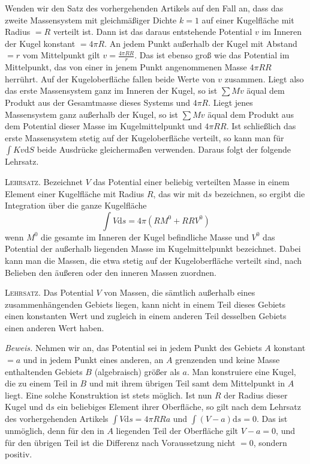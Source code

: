 Wenden wir den Satz des vorhergehenden Artikels auf den Fall an, dass das zweite Massensystem mit gleichmäßiger Dichte $k=1$ auf einer Kugelfläche mit Radius $=R$ verteilt ist. Dann ist das daraus entstehende Potential $v$ im Inneren der Kugel konstant $=4\pi R$. An jedem Punkt außerhalb der Kugel mit Abstand $=r$ vom Mittelpunkt gilt $v=\frac{4\pi RR}{r}$. Das ist ebenso groß wie das Potential im Mittelpunkt, das von einer in jenem Punkt angenommenen Masse $4\pi RR$ herrührt. Auf der Kugeloberfläche fallen beide Werte von $v$ zusammen. Liegt also das erste Massensystem ganz im Inneren der Kugel, so ist $\sum Mv$ äqual dem Produkt aus der Gesamtmasse dieses Systems und $4\pi R$. Liegt jenes Massensystem ganz außerhalb der Kugel, so ist $\sum Mv$ äqual dem Produkt aus dem Potential dieser Masse im Kugelmittelpunkt und $4\pi RR$. Ist schließlich das erste Massensystem stetig auf der Kugeloberfläche verteilt, so kann man für $\int Kv\mathrm dS$ beide Ausdrücke gleichermaßen verwenden. Daraus folgt der folgende Lehrsatz.

\textsc{Lehrsatz.} Bezeichnet $V$ das Potential einer beliebig verteilten Masse in einem Element einer Kugelfläche mit Radius $R$, das wir mit $\mathrm ds$ bezeichnen, so ergibt die Integration über die ganze Kugelfläche
\[
\int V\mathrm ds=4\pi(RM^0+RRV^0)
\]
wenn $M^0$ die gesamte im Inneren der Kugel befindliche Masse und $V^0$ das Potential der außerhalb liegenden Masse im Kugelmittelpunkt bezeichnet. Dabei kann man die Massen, die etwa stetig auf der Kugeloberfläche verteilt sind, nach Belieben den äußeren oder den inneren Massen zuordnen.

%
\textsc{Lehrsatz.} Das Potential $V$ von Massen, die sämtlich außerhalb eines zusammenhängenden Gebiets liegen, kann nicht in einem Teil dieses Gebiets einen konstanten Wert und zugleich in einem anderen Teil desselben Gebiets einen anderen Wert haben.

\textit{Beweis.} Nehmen wir an, das Potential sei in jedem Punkt des Gebiets $A$ konstant $=a$ und in jedem Punkt eines anderen, an $A$ grenzenden und keine Masse enthaltenden Gebiets $B$ (algebraisch) größer als $a$. Man konstruiere eine Kugel, die zu einem Teil in $B$ und mit ihrem übrigen Teil samt dem Mittelpunkt in $A$ liegt. Eine solche Konstruktion ist stets möglich. Ist nun $R$ der Radius dieser Kugel und $\mathrm ds$ ein beliebiges Element ihrer Oberfläche, so gilt nach dem Lehrsatz des vorhergehenden Artikels $\int V\mathrm ds=4\pi RRa$ und $\int(V-a)\mathrm ds=0$. Das ist unmöglich, denn für den in $A$ liegenden Teil der Oberfläche gilt $V-a=0$, und für den übrigen Teil ist die Differenz nach Voraussetzung nicht $=0$, sondern positiv.

